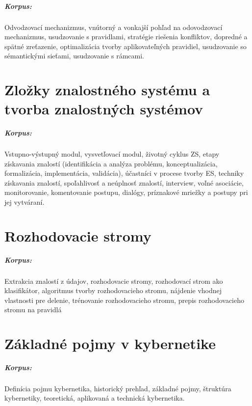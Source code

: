 \documentclass[11pt,a4paper]{report}
\begin{document}
\paragraph{Korpus:} Odvodzovací mechanizmus, vnútorný a vonkajší pohľad na odovodzovací mechanizmus, usudzovanie s pravidlami, stratégie riešenia konfliktov, dopredné a spätné zreťazenie, optimalizácia tvorby aplikovateľných pravidiel, usudzovanie so sémantickými sieťami, usudzovanie s rámcami.

\chapter{Zložky znalostného systému a tvorba znalostných systémov}

\paragraph{Korpus:} Vstupno-výstupný modul, vysvetľovací modul, životný cyklus ZS, etapy získavania znalostí (identifikácia a analýza problému, konceptualizácia, formalizácia, implementácia, validácia), účastníci v procese tvorby ES, techniky získavania znalostí, spoľahlivosť a neúplnosť znalostí, interview, voľné asociácie, monitorovanie, komentovanie postupu, dialógy, príznakové mriežky a postupy pri jej vytváraní.

\chapter{Rozhodovacie stromy}

\paragraph{Korpus:} Extrakcia znalostí z údajov, rozhodovacie stromy, rozhodovací strom ako klasifikátor, algoritmus tvorby rozhodovacieho stromu, nájdenie vhodnej vlastnosti pre delenie, trénovanie rozhodovacieho stromu, prepis rozhodovacieho stromu na pravidlá

\chapter{Základné pojmy v kybernetike}

\paragraph{Korpus:} Definícia pojmu kybernetika, historický prehľad, základné pojmy, štruktúra kybernetiky, teoretická, aplikovaná a technická kybernetika.
\end{document}
